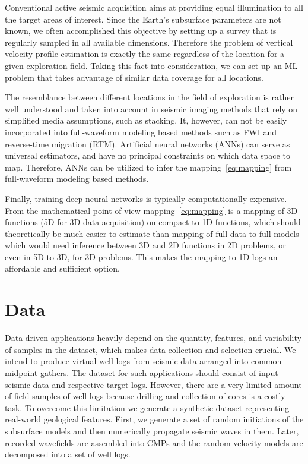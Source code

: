 \documentclass[paper,twocolomn]{geophysics}
\begin{document}
Conventional active seismic acquisition aims at providing equal illumination to all the target areas of interest. Since the Earth's subsurface parameters are not known, we often accomplished this objective by setting up a survey that is regularly sampled in all available dimensions. Therefore the problem of vertical velocity profile estimation is exactly the same regardless of the location for a given exploration field. Taking this fact into consideration, we can set up an ML problem that takes advantage of similar data coverage for all locations. 

The resemblance between different locations in the field of exploration is rather well understood and taken into account in seismic imaging methods that rely on simplified media assumptions, such as stacking. It, however, can not be easily incorporated into full-waveform modeling based methods such as FWI and reverse-time migration (RTM).   
%
Artificial neural networks (ANNs) can serve as universal estimators, and have no principal constraints on which data space to map. Therefore, ANNs can be utilized to infer the mapping~\eqref{eq:mapping} from full-waveform modeling based methods. 

Finally, training deep neural networks is typically computationally expensive. From the mathematical point of view mapping~\eqref{eq:mapping} is a mapping of 3D functions (5D for 3D data acquisition) on compact to 1D functions, which should theoretically be much easier to estimate than mapping of full data to full models which would need inference between 3D and 2D functions in 2D problems, or even in 5D to 3D, for 3D problems. This makes the mapping to 1D logs an affordable and sufficient option.


\section{Data}
Data-driven applications heavily depend on the quantity, features, and variability of samples in the dataset, which makes data collection and selection crucial. 
%
We intend to produce virtual well-logs from seismic data arranged into common-midpoint gathers. The dataset for such applications should consist of input seismic data and respective target logs. However, there are a very limited amount of field samples of well-logs because drilling and collection of cores is a costly task. 
%
To overcome this limitation we generate a synthetic dataset representing real-world geological features. First, we generate a set of random initiations of the subsurface models and then numerically propagate seismic waves in them. Later, recorded wavefields are assembled into CMPs and the random velocity models are decomposed into a set of well logs.
\end{document}
